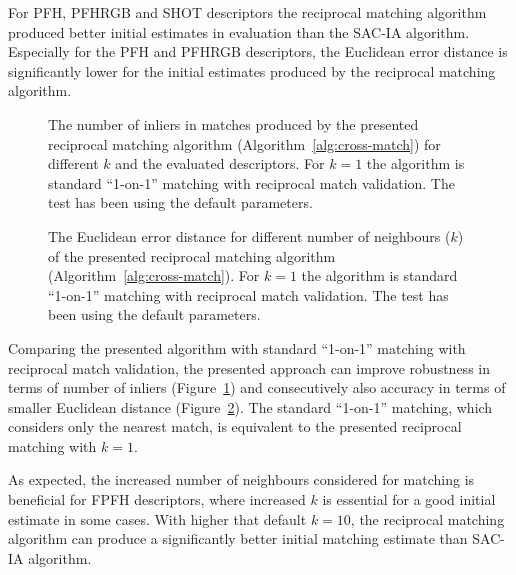 For \gls{PFH}, \gls{PFHRGB} and \gls{SHOT} descriptors the reciprocal matching algorithm produced better initial estimates in evaluation than the \gls{SAC-IA} algorithm. Especially for the \gls{PFH} and \gls{PFHRGB} descriptors, the Euclidean error distance is significantly lower for the initial estimates produced by the reciprocal matching algorithm.

\begin{figure}
  \centering
  
  \caption[The number of inliers per $k$ in the reciprocal matching algorithm]{The number of inliers in matches produced by the presented reciprocal matching algorithm (Algorithm~\ref{alg:cross-match}) for different $k$ and the evaluated descriptors. For $k=1$ the algorithm is standard ``1-on-1'' matching with reciprocal match validation. The test has been using the default parameters.}
  \label{fig:plot:matching_k_inliers}
\end{figure}

\begin{figure}
  \centering
  
  \caption[The Euclidean distance per $k$ in the reciprocal matching algorithm]{The Euclidean error distance for different number of neighbours ($k$) of the presented reciprocal matching algorithm (Algorithm~\ref{alg:cross-match}). For $k=1$ the algorithm is standard ``1-on-1'' matching with reciprocal match validation. The test has been using the default parameters.}
  \label{fig:plot:matching_k_dist}
\end{figure}

Comparing the presented algorithm with standard ``1-on-1'' matching with reciprocal match validation, the presented approach can improve robustness in terms of number of inliers (Figure~\ref{fig:plot:matching_k_inliers}) and consecutively also accuracy in terms of smaller Euclidean distance (Figure~\ref{fig:plot:matching_k_dist}). The standard ``1-on-1'' matching, which considers only the nearest match, is equivalent to the presented reciprocal matching with $k=1$.

As expected, the increased number of neighbours considered for matching is beneficial for \gls{FPFH} descriptors, where increased $k$ is essential for a good initial estimate in some cases. With higher that default $k=10$, the reciprocal matching algorithm can produce a significantly better initial matching estimate than \gls{SAC-IA} algorithm.

